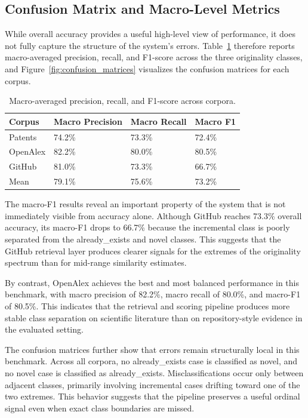 \subsection{Confusion Matrix and Macro-Level Metrics}

While overall accuracy provides a useful high-level view of performance, it does not fully capture the structure of the system's errors. Table~\ref{tab:macrof1} therefore reports macro-averaged precision, recall, and F1-score across the three originality classes, and Figure~\ref{fig:confusion_matrices} visualizes the confusion matrices for each corpus.

\begin{table}[width=\textwidth,cols=4,pos=ht]
    \caption{Macro-averaged precision, recall, and F1-score across corpora.}
    \label{tab:macrof1}
    \begin{tabular*}{\textwidth}{@{\extracolsep{\fill}}llll@{}}
        \toprule
        Corpus & Macro Precision & Macro Recall & Macro F1 \\
        \midrule
        Patents  & 74.2\% & 73.3\% & 72.4\% \\
        OpenAlex & 82.2\% & 80.0\% & 80.5\% \\
        GitHub   & 81.0\% & 73.3\% & 66.7\% \\
        \midrule
        Mean & 79.1\% & 75.6\% & 73.2\% \\
        \bottomrule
    \end{tabular*}
\end{table}

The macro-F1 results reveal an important property of the system that is not immediately visible from accuracy alone. Although GitHub reaches 73.3\% overall accuracy, its macro-F1 drops to 66.7\% because the incremental class is poorly separated from the already\_exists and novel classes. This suggests that the GitHub retrieval layer produces clearer signals for the extremes of the originality spectrum than for mid-range similarity estimates.

By contrast, OpenAlex achieves the best and most balanced performance in this benchmark, with macro precision of 82.2\%, macro recall of 80.0\%, and macro-F1 of 80.5\%. This indicates that the retrieval and scoring pipeline produces more stable class separation on scientific literature than on repository-style evidence in the evaluated setting.

The confusion matrices further show that errors remain structurally local in this benchmark. Across all corpora, no already\_exists case is classified as novel, and no novel case is classified as already\_exists. Misclassifications occur only between adjacent classes, primarily involving incremental cases drifting toward one of the two extremes. This behavior suggests that the pipeline preserves a useful ordinal signal even when exact class boundaries are missed.

